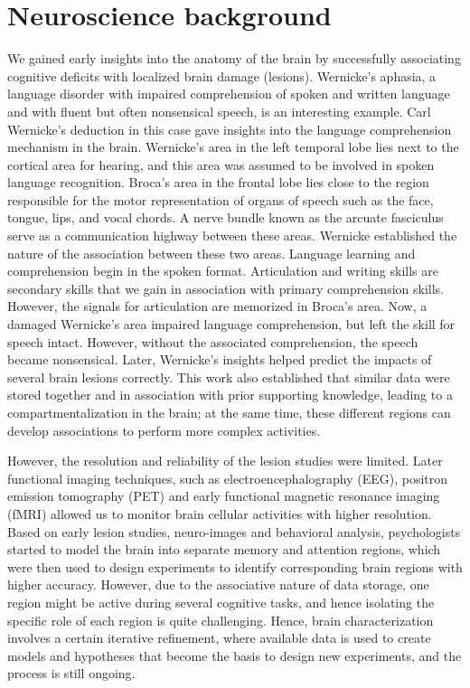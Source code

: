 \documentclass[reprint,amsmath,amssymb,apr,aip,onecolumn, 11pt]{revtex4-1}
\begin{document}
\section{Neuroscience background}


We gained early insights into the anatomy of the brain by successfully associating cognitive deficits with localized brain damage (lesions). Wernicke's aphasia, a language disorder with impaired comprehension of spoken and written language and with fluent but often nonsensical speech, is an interesting example. Carl Wernicke's deduction in this case gave insights into the language comprehension mechanism in the brain. Wernicke's area in the left temporal lobe lies next to the cortical area for hearing, and this area was assumed to be involved in spoken language recognition. Broca's area in the frontal lobe lies close to the region responsible for the motor representation of organs of speech such as the face, tongue, lips, and vocal chords. A nerve bundle known as the arcuate fasciculus serve as a communication highway between these areas. Wernicke established the nature of the association between these two areas. Language learning and comprehension begin in the spoken format. Articulation and writing skills are secondary skills that we gain in association with primary comprehension skills. However, the signals for articulation are memorized in Broca's area. Now, a damaged Wernicke's area impaired language comprehension, but left the skill for speech intact. However, without the associated comprehension, the speech became nonsensical. Later, Wernicke's insights helped predict the impacts of several brain lesions correctly. This work also established that similar data were stored together and in association with prior supporting knowledge, leading to a compartmentalization in the brain; at the same time, these different regions can develop associations to perform more complex activities.  



However, the resolution and reliability of the lesion studies were limited. Later functional imaging techniques, such as electroencephalography (EEG), positron emission tomography (PET) and early functional magnetic resonance imaging (fMRI) allowed us to monitor brain cellular activities with higher resolution. Based on early lesion studies, neuro-images and behavioral analysis, psychologists started to model the brain into separate memory and attention regions, which were then used to design experiments to identify corresponding brain regions with higher accuracy. However,  due to the associative nature of data storage, one region might be active during several cognitive tasks, and hence isolating the specific role of each region is quite challenging. Hence, brain characterization involves a certain iterative refinement, where available data is used to create models and hypotheses that become the basis to design new experiments, and the process is still ongoing. 
\end{document}
